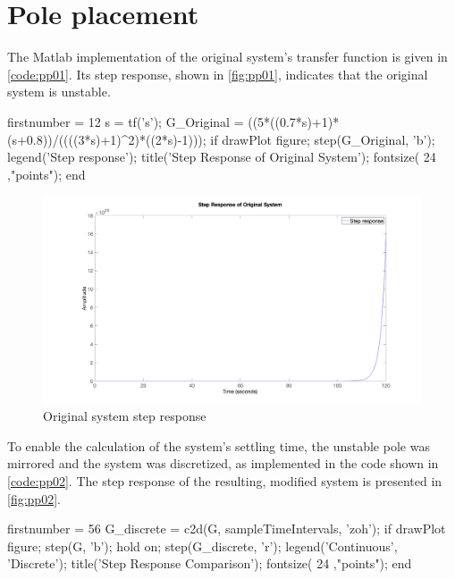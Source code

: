 \FloatBarrier
\section{Pole placement}
The Matlab implementation of the original system's transfer function is given in \autoref{code:pp01}. Its step response, shown in \autoref{fig:pp01}, indicates that the original system is unstable.

\begin{code}
	\begin{matlabcode}{firstnumber = 12}
s = tf('s');
G_Original = ((5*((0.7*s)+1)*(s+0.8))/((((3*s)+1)^2)*((2*s)-1)));
if drawPlot
	figure;
	step(G_Original, 'b');
	legend('Step response');
	title('Step Response of Original System');
	fontsize( 24 ,"points");
end
	\end{matlabcode}
	\label{code:pp01}
\end{code}

\begin{figure}
	\centering
	\includegraphics[width=\textwidth]{images/pp01.png}
	\caption{Original system step response}
	\label{fig:pp01}
\end{figure}

To enable the calculation of the system's settling time, the unstable pole was mirrored and the system was discretized, as implemented in the code shown in \autoref{code:pp02}. The step response of the resulting, modified system is presented in \autoref{fig:pp02}.

\begin{code}
	\begin{matlabcode}{firstnumber = 56}
G_discrete = c2d(G, sampleTimeIntervals, 'zoh');
if drawPlot
	figure;
	step(G, 'b');
	hold on;
	step(G_discrete, 'r');
	legend('Continuous', 'Discrete');
	title('Step Response Comparison');
	fontsize( 24 ,"points");
end
	\end{matlabcode}
	\label{code:pp02}
\end{code}

